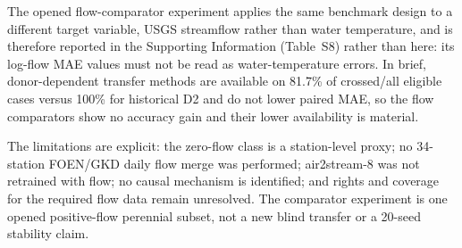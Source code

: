 The opened flow-comparator experiment applies the same benchmark design to a different target variable, USGS streamflow rather than water temperature, and is therefore reported in the Supporting Information (Table~S8) rather than here: its log-flow MAE values must not be read as water-temperature errors. In brief, donor-dependent transfer methods are available on 81.7\% of crossed/all eligible cases versus 100\% for historical D2 and do not lower paired MAE, so the flow comparators show no accuracy gain and their lower availability is material.

The limitations are explicit: the zero-flow class is a station-level proxy; no 34-station FOEN/GKD daily flow merge was performed; air2stream-8 was not retrained with flow; no causal mechanism is identified; and rights and coverage for the required flow data remain unresolved. The comparator experiment is one opened positive-flow perennial subset, not a new blind transfer or a 20-seed stability claim.
